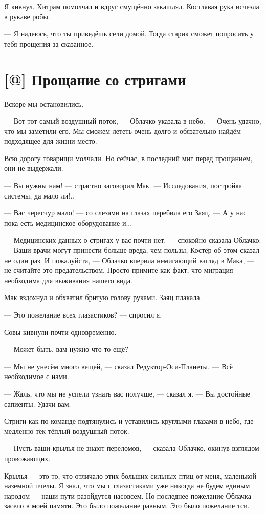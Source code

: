 Я кивнул.
Хитрам помолчал и вдруг смущённо закашлял.
Костлявая рука исчезла в рукаве робы.

--- Я надеюсь, что ты приведёшь сели домой.
Тогда старик сможет попросить у тебя прощения за сказанное.

\section{[@] Прощание со стригами}

\textspace

Вскоре мы остановились.

--- Вот тот самый воздушный поток, --- Облачко указала в небо.
--- Очень удачно, что мы заметили его.
Мы сможем лететь очень долго и обязательно найдём подходящее для жизни место.

Всю дорогу товарищи молчали.
Но сейчас, в последний миг перед прощанием, они не выдержали.

--- Вы нужны нам! --- страстно заговорил Мак.
--- Исследования, постройка системы, да мало ли!..

--- Вас чересчур мало! --- со слезами на глазах перебила его Заяц.
--- А у нас пока есть медицинское оборудование и...

--- Медицинских данных о стригах у вас почти нет, --- спокойно сказала Облачко.
--- Ваши врачи могут принести больше вреда, чем пользы, Костёр об этом сказал не один раз.
И пожалуйста, --- Облачко вперила немигающий взгляд в Мака, --- не считайте это предательством.
Просто примите как факт, что миграция необходима для выживания нашего вида.

Мак вздохнул и обхватил бритую голову руками.
Заяц плакала.

--- Это пожелание всех глазастиков? --- спросил я.

Совы кивнули почти одновременно.

--- Может быть, вам нужно что-то ещё?

--- Мы не унесём много вещей, --- сказал Редуктор-Оси-Планеты.
--- Всё необходимое с нами.

--- Жаль, что мы не успели узнать вас получше, --- сказал я.
--- Вы достойные сапиенты.
Удачи вам.

Стриги как по команде подтянулись и уставились круглыми глазами в небо, где медленно тёк тёплый воздушный поток.

--- Пусть ваши крылья не знают переломов, --- сказала Облачко, окинув взглядом провожающих.

Крылья --- это то, что отличало этих больших сильных птиц от меня, маленькой наземной пчелы.
Я знал, что мы с глазастиками уже никогда не будем единым народом --- наши пути разойдутся насовсем.
Но последнее пожелание Облачка засело в моей памяти.
Это было пожелание равным.
Это было пожелание тси.

